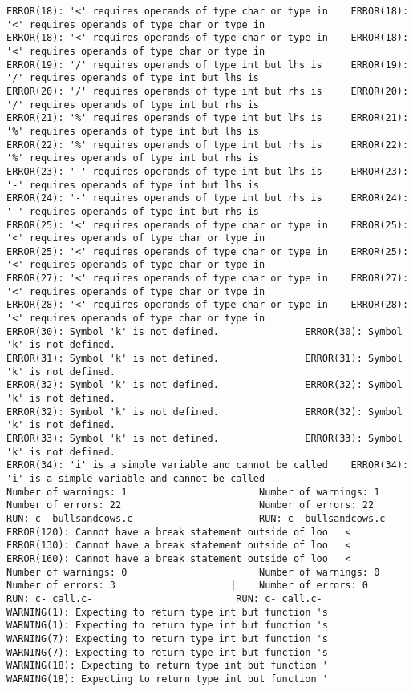 \documentclass[12pt]{book}
\begin{document}
\begin{lstlisting}
ERROR(18): '<' requires operands of type char or type in	ERROR(18): '<' requires operands of type char or type in
ERROR(18): '<' requires operands of type char or type in	ERROR(18): '<' requires operands of type char or type in
ERROR(19): '/' requires operands of type int but lhs is 	ERROR(19): '/' requires operands of type int but lhs is 
ERROR(20): '/' requires operands of type int but rhs is 	ERROR(20): '/' requires operands of type int but rhs is 
ERROR(21): '%' requires operands of type int but lhs is 	ERROR(21): '%' requires operands of type int but lhs is 
ERROR(22): '%' requires operands of type int but rhs is 	ERROR(22): '%' requires operands of type int but rhs is 
ERROR(23): '-' requires operands of type int but lhs is 	ERROR(23): '-' requires operands of type int but lhs is 
ERROR(24): '-' requires operands of type int but rhs is 	ERROR(24): '-' requires operands of type int but rhs is 
ERROR(25): '<' requires operands of type char or type in	ERROR(25): '<' requires operands of type char or type in
ERROR(25): '<' requires operands of type char or type in	ERROR(25): '<' requires operands of type char or type in
ERROR(27): '<' requires operands of type char or type in	ERROR(27): '<' requires operands of type char or type in
ERROR(28): '<' requires operands of type char or type in	ERROR(28): '<' requires operands of type char or type in
ERROR(30): Symbol 'k' is not defined.				ERROR(30): Symbol 'k' is not defined.
ERROR(31): Symbol 'k' is not defined.				ERROR(31): Symbol 'k' is not defined.
ERROR(32): Symbol 'k' is not defined.				ERROR(32): Symbol 'k' is not defined.
ERROR(32): Symbol 'k' is not defined.				ERROR(32): Symbol 'k' is not defined.
ERROR(33): Symbol 'k' is not defined.				ERROR(33): Symbol 'k' is not defined.
ERROR(34): 'i' is a simple variable and cannot be called	ERROR(34): 'i' is a simple variable and cannot be called
Number of warnings: 1						Number of warnings: 1
Number of errors: 22						Number of errors: 22
RUN: c- bullsandcows.c-						RUN: c- bullsandcows.c-
ERROR(120): Cannot have a break statement outside of loo   <
ERROR(130): Cannot have a break statement outside of loo   <
ERROR(160): Cannot have a break statement outside of loo   <
Number of warnings: 0						Number of warnings: 0
Number of errors: 3					   |	Number of errors: 0
RUN: c- call.c-							RUN: c- call.c-
WARNING(1): Expecting to return type int but function 's	WARNING(1): Expecting to return type int but function 's
WARNING(7): Expecting to return type int but function 's	WARNING(7): Expecting to return type int but function 's
WARNING(18): Expecting to return type int but function '	WARNING(18): Expecting to return type int but function '

\end{lstlisting}
\end{document}
